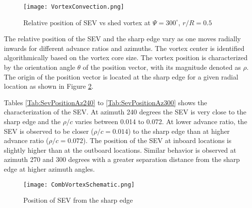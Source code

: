 \documentclass[%
 reprint,
 showkeys,
 amsmath,amssymb,
 aps,
]{revtex4-1}
\begin{document}
\begin{figure}[!ht]
\center
\texttt{[image: VortexConvection.png]}
\caption{Relative position of SEV vs shed vortex at $\Psi=300^{\circ}$, $r/R=0.5$}
\label{VortexConvection}
\end{figure}

The relative position of the SEV and the sharp edge vary as one moves radially inwards for different advance ratios and azimuths. The vortex center is identified algorithmically based on the vortex core size. The vortex position is characterized by the orientation angle $\theta$ of the position vector, with its magnitude denoted as $\rho$. The origin of the position vector is located at the sharp edge for a given radial location as shown in Figure \ref{VortexSchematic}. 

Tables \ref{Tab:SevPositionAz240} to \ref{Tab:SevPositionAz300} shows the characterization of the SEV. At azimuth 240 degrees the SEV is very close to the sharp edge and the $\rho/c$ varies between 0.014 to 0.072. At lower advance ratio, the SEV is observed to be closer ($\rho/c = 0.014$) to the sharp edge than at higher advance ratio ($\rho/c = 0.072$). The position of the SEV at inboard locations is slightly higher than at the outboard locations. Similar behavior is observed at azimuth 270 and 300 degrees with a greater separation distance from the sharp edge at higher azimuth angles. 



\begin{figure}[!ht]
	\texttt{[image: CombVortexSchematic.png]} 
	\caption{Position of SEV from the sharp edge}
	\label{VortexSchematic}
	
\end{figure}
\end{document}
